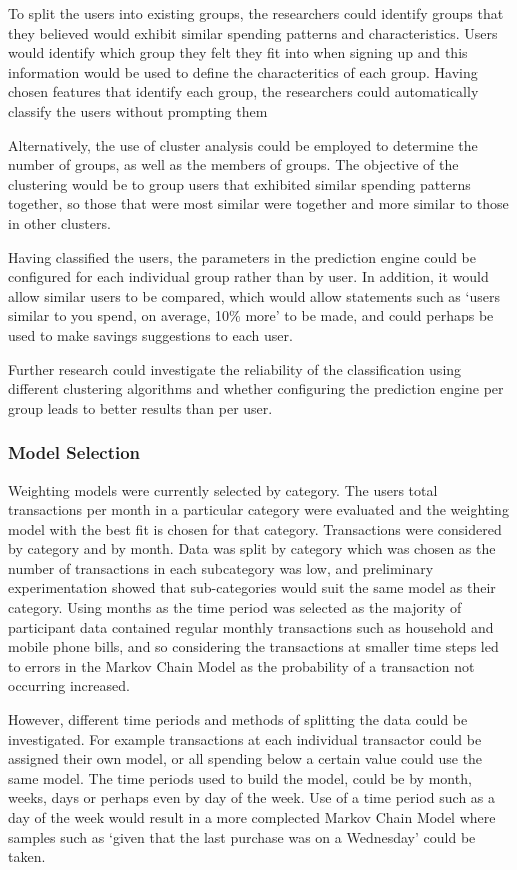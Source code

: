 To split the users into existing groups, the researchers could identify groups that they believed would exhibit similar spending patterns and characteristics. Users would identify which group they felt they fit into when signing up and this information would be used to define the characteritics of each group. Having chosen features that identify each group, the researchers could automatically classify the users without prompting them

Alternatively, the use of cluster analysis could be employed to determine the number of groups, as well as the members of groups. The objective of the clustering would be to group users that exhibited similar spending patterns together, so those that were most similar were together and more similar to those in other clusters. 

Having classified the users, the parameters in the prediction engine could be configured for each individual group rather than by user. In addition, it would allow similar users to be compared, which would allow statements such as `users similar to you spend, on average, 10\% more' to be made, and could perhaps be used to make savings suggestions to each user.  

Further research could investigate the reliability of the classification using different clustering algorithms and whether configuring the prediction engine per group leads to better results than per user.

\subsubsection{Model Selection}
\label{section:overfittingmodels}
Weighting models were currently selected by category. The users total transactions per month in a particular category were evaluated and the weighting model with the best fit is chosen for that category. Transactions were considered by category and by month. Data was split by category which was chosen as the number of transactions in each subcategory was low, and preliminary experimentation showed that  sub-categories would suit the same model as their category. Using months as the time period was selected as the majority of participant data contained regular monthly transactions such as household and mobile phone bills, and so considering the transactions at smaller time steps led to errors in the Markov Chain Model as the probability of a transaction not occurring increased.

However, different time periods and methods of splitting the data could be investigated. For example transactions at each individual transactor could be assigned their own model, or all spending below a certain value could use the same model. The time periods used to build the model, could be by month, weeks, days or perhaps even by day of the week. Use of a time period such as a day of the week would result in a more complected Markov Chain Model where samples such as `given that the last purchase was on a Wednesday' could be taken.

